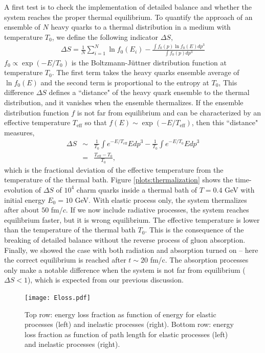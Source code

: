\documentclass[aps, prc, reprint, amsmath, groupedaddress, nofootinbib]{revtex4-1}
\begin{document}
A first test is to check the implementation of detailed balance and whether the system reaches the proper thermal equilibrium.
To quantify the approach of an ensemble of $N$ heavy quarks to a thermal distribution  in a medium with temperature $T_0$, we define the following indicator $\Delta S$,
\begin{eqnarray}
\Delta S = \frac{1}{N}\sum_{i=1}^{N} \ln f_0(E_i) - \frac{\int f_0(p)\ln f_0(E) dp^3}{\int f_0(p) dp^3}
\end{eqnarray}
$f_0 \propto \exp(-E/T_0)$ is the Boltzmann-J\"uttner distribution function at temperature $T_0$. 
The first term takes the heavy quarks ensemble average of $\ln f_0(E)$ and the second term is proportional to the entropy at $T_0$,
This difference $\Delta S$ defines a ``distance" of the heavy quark ensemble to the thermal distribution, and it vanishes when the ensemble thermalizes.
If the ensemble distribution function $f$ is not far from equilibrium and can be characterized by an effective temperature $T_{\textrm{eff}}$ so that $f(E)\sim \exp(-E/T_{\textrm{eff}})$, then this ``distance" measures,
\begin{eqnarray}
\nonumber
\Delta S &\sim& \frac{1}{T_0}\int  e^{-E/T_{\textrm{eff}}} E dp^3 - \frac{1}{T_0}\int e^{-E/T_0} E dp^3 \\
&=& \frac{T_\textrm{eff}-T_0}{T_0},
\end{eqnarray}
which is the fractional deviation of the effective temperature from the temperature of the thermal bath.
Figure \ref{plots:thermalization} shows the time-evolution of $\Delta S$ of $10^4$ charm quarks inside a thermal bath of $T=0.4$ GeV with initial energy $E_0 = 10$ GeV.
With elastic process only, the system thermalizes after about $50$ fm/$c$.
If we now include radiative processes, the system reaches equilibrium faster, but it is wrong equilibrium.
The effective temperature is lower than the temperature of the thermal bath $T_0$.
This is the consequence of the breaking of detailed balance without the reverse process of gluon absorption.
Finally, we showed the case with both radiation and absorption turned on -- here the correct equilibrium is reached after $t\sim 20$ fm/c.
The absorption processes only make a notable difference when the system is not far from equilibrium ($\Delta S < 1$), which is expected from our previous discussion.
\begin{figure}
\texttt{[image: Eloss.pdf]}
\caption{Top row: energy loss fraction as function of energy for elastic processes (left) and inelastic processes (right). Bottom row: energy loss fraction as function of path length for elastic processes (left) and inelastic processes (right).}\label{plots:dEE}
\end{figure}
\end{document}
